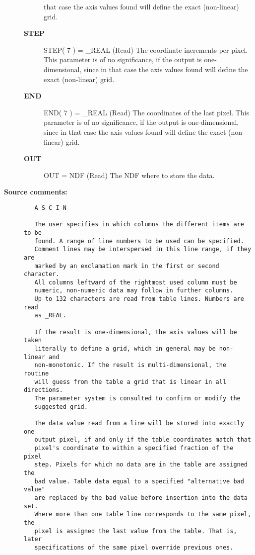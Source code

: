\begin{description}
\begin{description}
   that case the axis values found will define the exact
   (non-linear) grid.
\item [{\bf STEP}]
STEP( 7 ) = _REAL (Read)
   The coordinate increments per pixel. This parameter is of
   no significance, if the output is one-dimensional, since in
   that case the axis values found will define the exact
   (non-linear) grid.
\item [{\bf END}]
END( 7 ) = _REAL (Read)
   The coordinates of the last pixel. This parameter is of
   no significance, if the output is one-dimensional, since in
   that case the axis values found will define the exact
   (non-linear) grid.
\item [{\bf OUT}]
OUT = NDF (Read)
   The NDF where to store the data.

\end{description}

\item [{\bf Source comments:}]
\begin{verbatim}
   A S C I N

   The user specifies in which columns the different items are to be
   found. A range of line numbers to be used can be specified.
   Comment lines may be interspersed in this line range, if they are
   marked by an exclamation mark in the first or second character.
   All columns leftward of the rightmost used column must be
   numeric, non-numeric data may follow in further columns.
   Up to 132 characters are read from table lines. Numbers are read
   as _REAL.

   If the result is one-dimensional, the axis values will be taken
   literally to define a grid, which in general may be non-linear and
   non-monotonic. If the result is multi-dimensional, the routine
   will guess from the table a grid that is linear in all directions.
   The parameter system is consulted to confirm or modify the
   suggested grid.

   The data value read from a line will be stored into exactly one
   output pixel, if and only if the table coordinates match that
   pixel's coordinate to within a specified fraction of the pixel
   step. Pixels for which no data are in the table are assigned the
   bad value. Table data equal to a specified "alternative bad value"
   are replaced by the bad value before insertion into the data set.
   Where more than one table line corresponds to the same pixel, the
   pixel is assigned the last value from the table. That is, later
   specifications of the same pixel override previous ones.


\end{verbatim}
\end{description}
